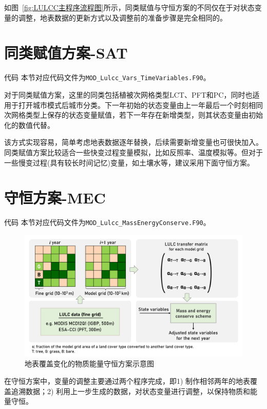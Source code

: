 如图~\ref{fig:LULCC主程序流程图}所示，同类赋值与守恒方案的不同仅在于对状态变量的调整，地表数据的更新方式以及调整前的准备步骤是完全相同的。

\section{同类赋值方案-SAT}
\begin{mymdframed}{代码}
  本节对应代码文件为\texttt{MOD\_Lulcc\_Vars\_TimeVariables.F90}。
\end{mymdframed}

对于同类赋值方案，这里的同类包括植被次网格类型LCT、PFT和PC，同时也适用于打开城市模式后城市分类。下一年初始的状态变量由上一年最后一个时刻相同次网格类型上保存的状态变量赋值，若下一年存在新增类型，则其状态变量由初始化的数值代替。

该方式实现容易，简单考虑地表数据逐年替换，后续需要新增变量也可很快加入。同类赋值方案比较适合一些快变过程变量模拟，比如反照率、温度模拟等。但对于一些慢变过程(具有较长时间记忆)变量，如土壤水等，建议采用下面守恒方案。

\section{守恒方案-MEC}
\begin{mymdframed}{代码}
  本节对应代码文件为\texttt{MOD\_Lulcc\_MassEnergyConserve.F90}。
\end{mymdframed}

{
  \begin{figure}[htbp]
    \centering
    \includegraphics[width=\textwidth]{Figures/土地利用与土地覆盖变化模拟/LULCC流程图_v2.png}
    \caption{地表覆盖变化的物质能量守恒方案示意图}
    \label{fig:LULCC流程图}
  \end{figure}
}

在守恒方案中，变量的调整主要通过两个程序完成，即1) 制作相邻两年的地表覆盖追溯数据；2) 利用上一步生成的数据，对状态变量进行调整，以保持物质和能量守恒。

